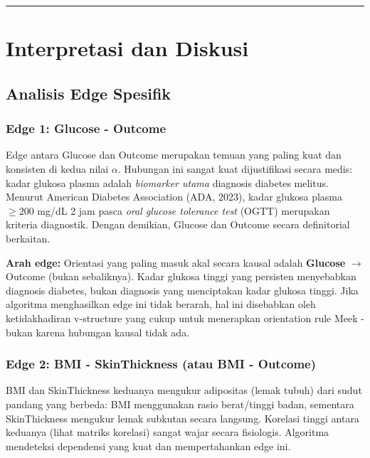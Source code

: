 \documentclass[
  11pt,
]{article}
\begin{document}
\begin{center}\rule{0.5\linewidth}{0.5pt}\end{center}

\section{Interpretasi dan Diskusi}\label{interpretasi-dan-diskusi}

\subsection{Analisis Edge Spesifik}\label{analisis-edge-spesifik}

\subsubsection{Edge 1: Glucose -
Outcome}\label{edge-1-glucose---outcome}

Edge antara Glucose dan Outcome merupakan temuan yang paling kuat dan
konsisten di kedua nilai \(\alpha\). Hubungan ini sangat kuat
dijustifikasi secara medis: kadar glukosa plasma adalah \emph{biomarker
utama} diagnosis diabetes melitus. Menurut American Diabetes Association
(ADA, 2023), kadar glukosa plasma \(\geq 200\) mg/dL 2 jam pasca
\emph{oral glucose tolerance test} (OGTT) merupakan kriteria diagnostik.
Dengan demikian, Glucose dan Outcome secara definitorial berkaitan.

\textbf{Arah edge:} Orientasi yang paling masuk akal secara kausal
adalah \textbf{Glucose} \(\to\) Outcome (bukan sebaliknya). Kadar
glukosa tinggi yang persisten menyebabkan diagnosis diabetes, bukan
diagnosis yang menciptakan kadar glukosa tinggi. Jika algoritma
menghasilkan edge ini tidak berarah, hal ini disebabkan oleh
ketidakhadiran v-structure yang cukup untuk menerapkan orientation rule
Meek - bukan karena hubungan kausal tidak ada.

\subsubsection{Edge 2: BMI - SkinThickness (atau BMI -
Outcome)}\label{edge-2-bmi---skinthickness-atau-bmi---outcome}

BMI dan SkinThickness keduanya mengukur adipositas (lemak tubuh) dari
sudut pandang yang berbeda: BMI menggunakan rasio berat/tinggi badan,
sementara SkinThickness mengukur lemak subkutan secara langsung.
Korelasi tinggi antara keduanya (lihat matriks korelasi) sangat wajar
secara fisiologis. Algoritma mendeteksi dependensi yang kuat dan
mempertahankan edge ini.
\end{document}
